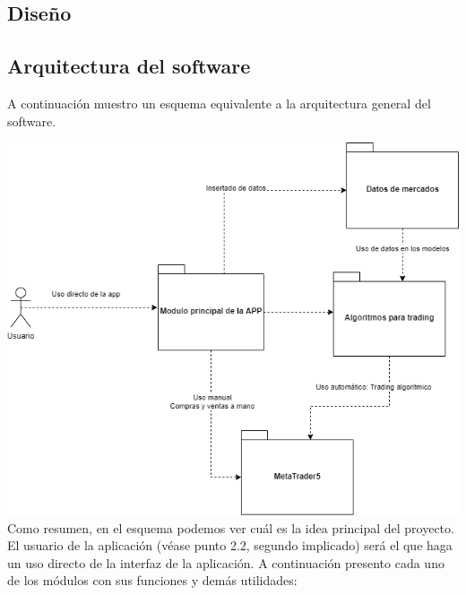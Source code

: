 \begin{titlepage}

\chapter{Diseño}


\section{Arquitectura del software}

A continuación muestro un esquema equivalente a la arquitectura general del software.\newline

\includegraphics[width=1\textwidth]{imagenes/arquitectura general.png}\\[0.1cm]

Como resumen, en el esquema podemos ver cuál es la idea principal del proyecto. El usuario de la aplicación (véase punto 2.2, segundo implicado) será el que haga un uso directo de la interfaz de la aplicación. A continuación presento cada uno de los módulos con sus funciones y demás utilidades:\newline


\end{titlepage}
